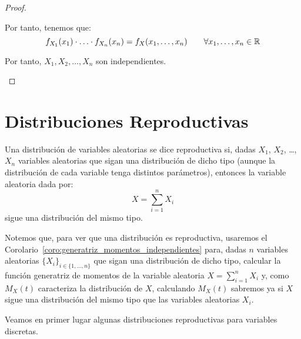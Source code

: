 \begin{proof}
\begin{description}
        Por tanto, tenemos que:
        \begin{equation*}
            f_{X_1}(x_1) \cdot \ldots \cdot f_{X_n}(x_n) = f_X(x_1, \ldots, x_n)
            \qquad \forall x_1, \ldots, x_n \in \mathbb{R}
        \end{equation*}

        Por tanto, $X_1,X_2,\ldots,X_n$ son independientes.

    \end{description}
\end{proof}


\section{Distribuciones Reproductivas}

\begin{definicion}
    Una distribución de variables aleatorias se dice reproductiva si, dadas $X_1$, $X_2$, \ldots, $X_n$ variables aleatorias que sigan una distribución de dicho tipo (aunque la distribución de cada variable tenga distintos parámetros), entonces la variable aleatoria dada por:
    \begin{equation*}
        X = \sum_{i=1}^{n} X_i
    \end{equation*}
    sigue una distribución del mismo tipo.
\end{definicion}

\begin{observacion}
    Notemos que, para ver que una distribución es reproductiva, usaremos el Corolario~\ref{coro:generatriz_momentos_independientes} para, dadas $n$ variables aleatorias $\{X_i\}_{i \in \{1,\ldots,n\}}$ que sigan una distribución de dicho tipo, calcular la función generatriz de momentos de la variable aleatoria $X=\sum\limits_{i=1}^n X_i$ y, como $M_X(t)$ caracteriza la distribución de $X$, calculando $M_X(t)$ sabremos ya si $X$ sigue una distribución del mismo tipo que las variables aleatorias $X_i$.
\end{observacion}

Veamos en primer lugar algunas distribuciones reproductivas para variables discretas.

